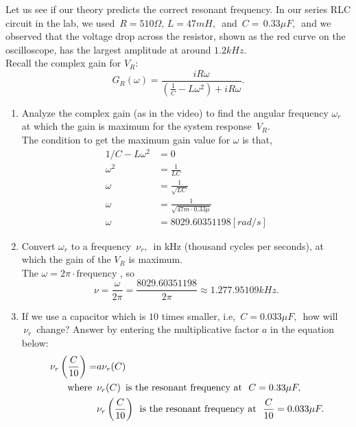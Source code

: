 Let us see if our theory predicts the correct resonant frequency. In our series RLC circuit in the lab,
we used $\, R= 510 \Omega ,\,  L=47 mH,\,$ and $\, C=\, 0.33\mu F,\,$ and
we observed that the voltage drop across the resistor,
shown as the red curve on the oscilloscope, has the largest amplitude at around $1.2 kHz.\, \,$\\
Recall the complex gain for $V _R$:
\begin{equation*}
  \displaystyle  G_ R(\omega )
  \displaystyle =
  \displaystyle \frac{iR\omega }{\left(\frac{1}{C}-L\omega ^2\right)+iR\omega }.
\end{equation*}
\begin{enumerate}
\item Analyze the complex gain (as in the video) to find the angular frequency $\omega _r$
  at which the gain is maximum for the system response $\, V_ R.$\\

  The condition to get the  maximum gain value for $\omega$ is that,
  \begin{align*}
    1/C -L \omega ^2 &= 0 \\
    \omega ^2 &= \frac{1}{LC} \\
    \omega &= \frac{1}{\sqrt{LC}} \\
    \omega &= \frac{1}{\sqrt{47m \cdot 0.33 \mu}} \\
    \omega &= 8029.60351198 [rad / s] 
  \end{align*}

\item Convert $\omega _r$ to a frequency $\, \nu _ r,\,$ in kHz (thousand cycles per seconds), at which the gain of the $V _R$ is maximum.\\

  The $\omega = 2 \pi \cdot \text{frequency}$ , so
  \begin{equation*}
    \nu = \frac{\omega}{2 \pi} = \frac{8029.60351198}{2 \pi} \approx 1.277.95109 kHz.
  \end{equation*}

\item If we use a capacitor which is $10$ times smaller, i.e, $\, C=0.033\mu F,\,$
  how will $\, \nu _ r\,$ change?
  Answer by entering the multiplicative factor $a$ in the equation below: \\
  \begin{align*}
    \displaystyle  \displaystyle \nu _{r}\left(\frac{C}{10}\right)
    \displaystyle =
    &\displaystyle  a \nu _{r}(C) \\
    \displaystyle \qquad \text {where } \,
    &\displaystyle \nu _{r}(C)\, \text { is the resonant frequency at }\, \, C=0.33\mu F, \\
    &\displaystyle \nu _{r}\left(\frac{C}{10}\right)\,
      \text { is the resonant frequency at }\, \, \frac{C}{10}=0.033\mu F.
  \end{align*}\\


\end{enumerate}
